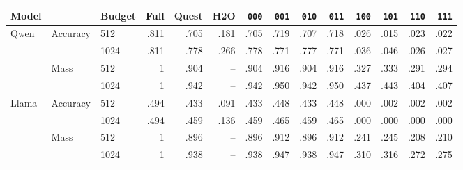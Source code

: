 \begin{tabular}{@{}lllrrrrrrrrrrr@{}}
\toprule
Model & & Budget & Full & Quest & H2O & \texttt{000} & \texttt{001} & \texttt{010} & \texttt{011} & \texttt{100} & \texttt{101} & \texttt{110} & \texttt{111} \\
\midrule
Qwen & Accuracy & 512 & .811 & .705 & .181 & .705 & .719 & .707 & .718 & .026 & .015 & .023 & .022 \\
 &  & 1024 & .811 & .778 & .266 & .778 & .771 & .777 & .771 & .036 & .046 & .026 & .027 \\
 & Mass & 512 & 1 & .904 & -- & .904 & .916 & .904 & .916 & .327 & .333 & .291 & .294 \\
 &  & 1024 & 1 & .942 & -- & .942 & .950 & .942 & .950 & .437 & .443 & .404 & .407 \\
\midrule
Llama & Accuracy & 512 & .494 & .433 & .091 & .433 & .448 & .433 & .448 & .000 & .002 & .002 & .002 \\
 &  & 1024 & .494 & .459 & .136 & .459 & .465 & .459 & .465 & .000 & .000 & .000 & .000 \\
 & Mass & 512 & 1 & .896 & -- & .896 & .912 & .896 & .912 & .241 & .245 & .208 & .210 \\
 &  & 1024 & 1 & .938 & -- & .938 & .947 & .938 & .947 & .310 & .316 & .272 & .275 \\
\bottomrule
\end{tabular}
